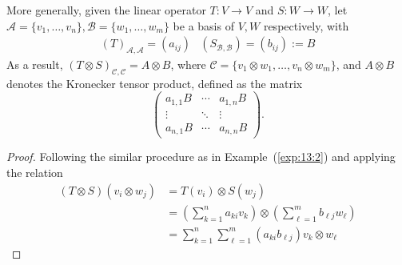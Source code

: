 \begin{proposition}
More generally, given the linear operator $T:V\to V$ and $S:W\to W$, 
let $\mathcal{A}=\{v_1,\dots,v_n\},\mathcal{B}=\{w_1,\dots,w_m\}$ be a basis of $V,W$ respectively, with
\[
\begin{array}{ll}
(T)_{\mathcal{A},\mathcal{A}}=(a_{ij})
&
(S_{\mathcal{B},\mathcal{B}})=(b_{ij}):=B
\end{array}
\]
As a result, $(T\otimes S)_{\mathcal{C},\mathcal{C}}=A\otimes B$, where 
$\mathcal{C}=\{v_1\otimes w_1,\dots, v_n\otimes w_m\}$, and $A\otimes B$ denotes the Kronecker tensor product, defined as the matrix
\[
\begin{pmatrix}
a_{1,1}B&\cdots&a_{1,n}B\\
\vdots&\ddots&\vdots\\
a_{n,1}B&\cdots&a_{n,n}B
\end{pmatrix}.
\]
\end{proposition}
\begin{proof}
Following the similar procedure as in Example~(\ref{exp:13:2}) and applying the relation
\begin{align*}
(T\otimes S)(v_i\otimes w_j)&=T(v_i)\otimes S(w_j)\\
&=\left(
\sum_{k=1}^na_{ki}v_k
\right)
\otimes
\left(
\sum_{\ell=1}^mb_{\ell j}w_\ell
\right)\\
&=\sum_{k=1}^n\sum_{\ell=1}^m(a_{ki}b_{\ell j})v_k\otimes w_{\ell}
\end{align*}
\end{proof}

